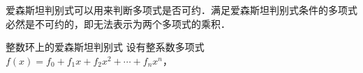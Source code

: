 
爱森斯坦判别式可以用来判断多项式是否可约．满足爱森斯坦判别式条件的多项式必然是不可约的，即无法表示为两个多项式的乘积．

\begin{theorem}{整数环上的爱森斯坦判别式}
设有整系数多项式$f(x)=f_0+f_1x+f_2x^2+\cdots+f_nx^n$，
\end{theorem}







